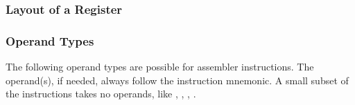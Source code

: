 \subsubsection{Layout of a Register}

\subsubsection{Operand Types}

The following operand types are possible for assembler
instructions. The operand(s), if needed, always follow the instruction
mnemonic. A small subset of the instructions takes no operands, like
, , , .

